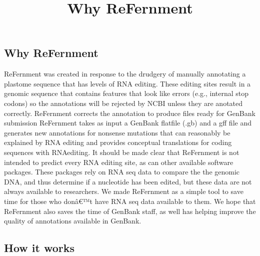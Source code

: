 \documentclass[]{article}
\title{Why ReFernment}
\date{}
\begin{document}
\maketitle

\hypertarget{why-refernment}{%
\subsection{Why ReFernment}\label{why-refernment}}

ReFernment was created in response to the drudgery of manually
annotating a plastome sequence that has levels of RNA editing. These
editing sites result in a genomic sequence that contains features that
look like errors (e.g., internal stop codons) so the annotations will be
rejected by NCBI unless they are anotated correctly. ReFernment corrects
the annotation to produce files ready for GenBank submission ReFernment
takes as input a GenBank flatfile (.gb) and a gff file and generates new
annotations for nonsense mutations that can reasonably be explained by
RNA editing and provides conceptual translations for coding sequences
with RNAediting. It should be made clear that ReFernment is not intended
to predict every RNA editing site, as can other available software
packages. These packages rely on RNA seq data to compare the the genomic
DNA, and thus determine if a nucleotide has been edited, but these data
are not always available to researchers. We made ReFernment as a simple
tool to save time for those who donâ€™t have RNA seq data available to
them. We hope that ReFernment also saves the time of GenBank staff, as
well has helping improve the quality of annotations available in
GenBank.

\hypertarget{how-it-works}{%
\subsection{How it works}\label{how-it-works}}
\end{document}
